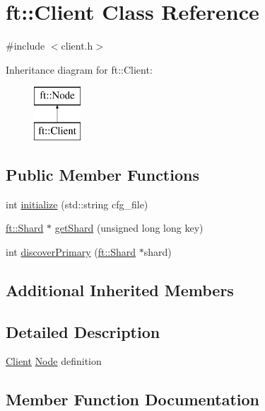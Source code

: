 \hypertarget{classft_1_1Client}{}\section{ft\+:\+:Client Class Reference}
\label{classft_1_1Client}


{\ttfamily \#include $<$client.\+h$>$}

Inheritance diagram for ft\+:\+:Client\+:\begin{figure}[H]
\begin{center}
\leavevmode
\includegraphics[height=2.000000cm]{classft_1_1Client}
\end{center}
\end{figure}
\subsection*{Public Member Functions}
\begin{DoxyCompactItemize}
\item 
int \mbox{\hyperlink{classft_1_1Client_a063db70469c9f2715bbad637d0353680}{initialize}} (std\+::string cfg\+\_\+file)
\item 
\mbox{\hyperlink{classft_1_1Shard}{ft\+::\+Shard}} $\ast$ \mbox{\hyperlink{classft_1_1Client_ac415215bb013b2d9832fe844c5d1c07a}{get\+Shard}} (unsigned long long key)
\item 
int \mbox{\hyperlink{classft_1_1Client_a345fef5f99ddffdd1c625bbceee918e0}{discover\+Primary}} (\mbox{\hyperlink{classft_1_1Shard}{ft\+::\+Shard}} $\ast$shard)
\end{DoxyCompactItemize}
\subsection*{Additional Inherited Members}


\subsection{Detailed Description}
\mbox{\hyperlink{classft_1_1Client}{Client}} \mbox{\hyperlink{classft_1_1Node}{Node}} definition 

\subsection{Member Function Documentation}
\mbox{\label{classft_1_1Client_a345fef5f99ddffdd1c625bbceee918e0}} 
